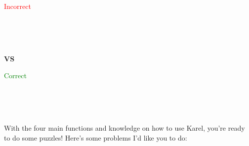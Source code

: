 \documentclass[12pt]{scrartcl}
\begin{document}
\begin{center}
    \begin{minipage}{0.45\textwidth}
        \centering
        \textcolor{red}{\:Incorrect}
        \smallskip

        \\
         \\
        \\
    \end{minipage}
    \hfill
    \begin{minipage}{0.05\textwidth}
        \centering
        \vspace{1.8em}
        \textbf{VS}
    \end{minipage}
    \hfill
    \begin{minipage}{0.45\textwidth}
        \centering
        \textcolor{green}{Correct}
        \smallskip
        
         \\
         \\
        \\
    \end{minipage}
\end{center}

With the four main functions and knowledge on how to use Karel, you're ready to do some puzzles! Here's some problems I'd like you to do:

\newpage
\end{document}

